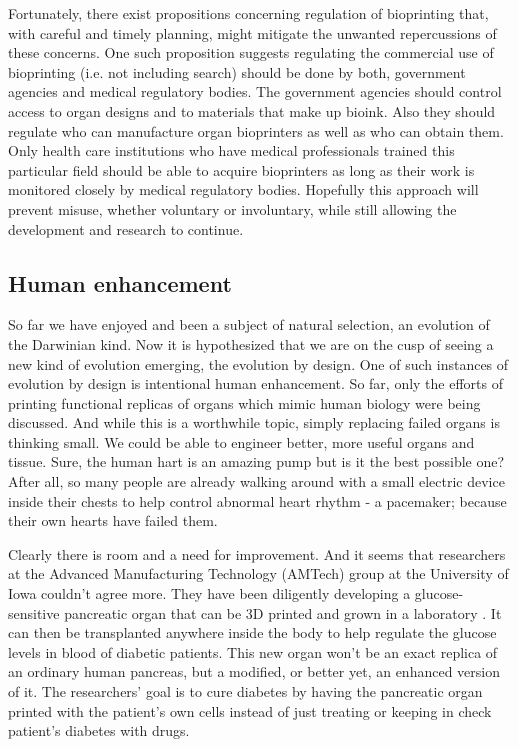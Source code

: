 \documentclass[12pt]{article} %
\begin{document}
Fortunately, there exist propositions concerning regulation of bioprinting that, with careful and timely planning, might mitigate the unwanted repercussions of these concerns. One such proposition suggests regulating the commercial use of bioprinting (i.e. not including search) should be done by both, government agencies and medical regulatory bodies. The government agencies should control access to organ designs and to materials that make up bioink. Also they should regulate who can manufacture organ bioprinters as well as who can obtain them. Only health care institutions who have medical professionals trained this particular field should be able to acquire bioprinters as long as their work is monitored closely by medical regulatory bodies. Hopefully this approach will prevent misuse, whether voluntary or involuntary, while still allowing the development and research to continue.


\subsection{Human enhancement} %

So far we have enjoyed and been a subject of natural selection, an evolution of the Darwinian kind. Now it is hypothesized that we are on the cusp of seeing a new kind of evolution emerging, the evolution by design. One of such instances of evolution by design is intentional human enhancement. So far, only the efforts of printing functional replicas of organs which mimic human biology were being discussed. And while this is a worthwhile topic, simply replacing failed organs is thinking small. We could be able to engineer better, more useful organs and tissue. Sure, the human hart is an amazing pump but is it the best possible one?  After all, so many people \cite{Wood:2002} are already walking around with a small electric device inside their chests to help control abnormal heart rhythm - a pacemaker; because their own hearts have failed them.

Clearly there is room and a need for improvement. And it seems that researchers at the Advanced Manufacturing Technology (AMTech) group at the University of Iowa couldn't agree more. They have been diligently developing a glucose-sensitive pancreatic organ that can be 3D printed and grown in a laboratory \cite{Ozbolat:2013}. It can then be transplanted anywhere inside the body to help regulate the glucose levels in blood of diabetic patients. This new organ won't be an exact replica of an ordinary human pancreas, but a modified, or better yet, an enhanced version of it. The researchers' goal is to cure diabetes by having the pancreatic organ printed with the patient's own cells instead of just treating or keeping in check patient's diabetes with drugs.
\end{document}
